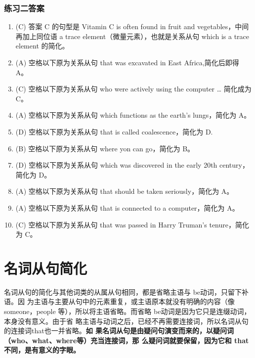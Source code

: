 \subsection{练习二答案}
\begin{enumerate}
\item (C) 答案 C 的句型是 Vitamin C is often found in fruit and vegetables，中间
  再加上同位语 a trace element（微量元素），也就是关系从句 which is a trace
  element 的简化。

\item (A) 空格以下原为关系从句 that was excavated in East Africa,简化后即得 A。

\item (C) 空格以下原为关系从句 who were actively using the computer \ldots{} 简化成为 C。

\item (A) 空格以下原为关系从句 which functions as the earth's lungs，简化为 A。

\item (D) 空格以下原为关系从句 that is called coalescence，简化为 D.

\item (B) 空格以下原为关系从句 where yon can go，简化为 B。

\item  (D) 空格以下原为关系从句 which was discovered in the early 20th century，简化为 D。

\item (A) 空格以下原为关系从句 that should be taken seriously，简化为 A。

\item  (A) 空格以下原为关系从句 that is connected to a computer，简化为 A。

\item (C) 空格以下原为关系从句 that was passed in Harry Truman's tenure，简化为 C。

\end{enumerate}



\chapter{名词从句简化}

名词从句的简化与其他词类的从属从句相同，都是省略主语与 be动词，只留下补语。因
为主语与主要从句中的元素重复，或主语原本就没有明确的内容（像someone，people
等），所以将主语省略。而省略 be动词是因为它只是连缀动词，本身没有意义。由于省
略主语与动词之后，已经不再需要连接词，所以名词从句的连接词that也一并省略。\textbf{如
果名词从句是由疑问句演变而来的，以疑问词（who、what、where等）充当连接词，那
么疑问词就要保留，因为它和 that 不同，是有意义的字眼。}

